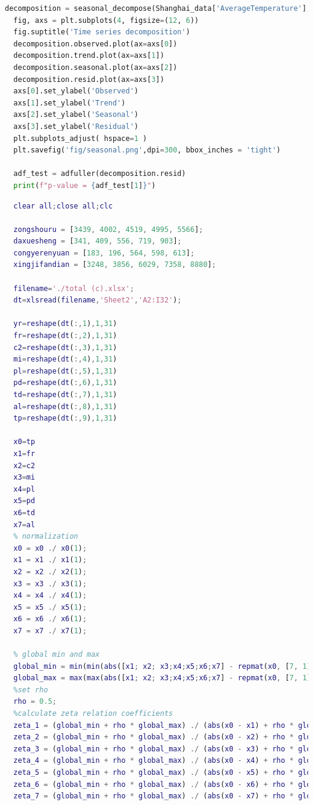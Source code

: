 \documentclass{apmcmthesis}
\begin{document}
\begin{lstlisting}[language=python, caption={The python source code of multiple analysis}]
  decomposition = seasonal_decompose(Shanghai_data['AverageTemperature'], model='additive', period=365, extrapolate_trend='freq')
  fig, axs = plt.subplots(4, figsize=(12, 6))
  fig.suptitle('Time series decomposition')
  decomposition.observed.plot(ax=axs[0])
  decomposition.trend.plot(ax=axs[1])
  decomposition.seasonal.plot(ax=axs[2])
  decomposition.resid.plot(ax=axs[3])
  axs[0].set_ylabel('Observed')
  axs[1].set_ylabel('Trend')
  axs[2].set_ylabel('Seasonal')
  axs[3].set_ylabel('Residual')
  plt.subplots_adjust( hspace=1 )
  plt.savefig('fig/seasonal.png',dpi=300, bbox_inches = 'tight')
  
  adf_test = adfuller(decomposition.resid)
  print(f"p-value = {adf_test[1]}")
  \end{lstlisting}
  
  \begin{lstlisting}[language=matlab, caption={The matlab source code of GRA}]
  % Grey relation analysis
  clear all;close all;clc
      
  zongshouru = [3439, 4002, 4519, 4995, 5566];
  daxuesheng = [341, 409, 556, 719, 903];
  congyerenyuan = [183, 196, 564, 598, 613];
  xingjifandian = [3248, 3856, 6029, 7358, 8880];
  
  filename='./total (c).xlsx';
  dt=xlsread(filename,'Sheet2','A2:I32');
  
  yr=reshape(dt(:,1),1,31)
  fr=reshape(dt(:,2),1,31)
  c2=reshape(dt(:,3),1,31)
  mi=reshape(dt(:,4),1,31)
  pl=reshape(dt(:,5),1,31)
  pd=reshape(dt(:,6),1,31)
  td=reshape(dt(:,7),1,31)
  al=reshape(dt(:,8),1,31)
  tp=reshape(dt(:,9),1,31)
  
  x0=tp
  x1=fr
  x2=c2
  x3=mi
  x4=pl
  x5=pd
  x6=td
  x7=al
  % normalization
  x0 = x0 ./ x0(1);
  x1 = x1 ./ x1(1);
  x2 = x2 ./ x2(1);
  x3 = x3 ./ x3(1);
  x4 = x4 ./ x4(1);
  x5 = x5 ./ x5(1);
  x6 = x6 ./ x6(1);
  x7 = x7 ./ x7(1);
  
  % global min and max
  global_min = min(min(abs([x1; x2; x3;x4;x5;x6;x7] - repmat(x0, [7, 1]))));
  global_max = max(max(abs([x1; x2; x3;x4;x5;x6;x7] - repmat(x0, [7, 1]))));   
  %set rho
  rho = 0.5;
  %calculate zeta relation coefficients
  zeta_1 = (global_min + rho * global_max) ./ (abs(x0 - x1) + rho * global_max);
  zeta_2 = (global_min + rho * global_max) ./ (abs(x0 - x2) + rho * global_max);
  zeta_3 = (global_min + rho * global_max) ./ (abs(x0 - x3) + rho * global_max);
  zeta_4 = (global_min + rho * global_max) ./ (abs(x0 - x4) + rho * global_max);
  zeta_5 = (global_min + rho * global_max) ./ (abs(x0 - x5) + rho * global_max);
  zeta_6 = (global_min + rho * global_max) ./ (abs(x0 - x6) + rho * global_max);
  zeta_7 = (global_min + rho * global_max) ./ (abs(x0 - x7) + rho * global_max);
  

\end{lstlisting}
\end{document}
